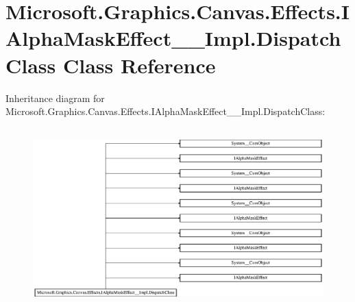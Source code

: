 \hypertarget{class_microsoft_1_1_graphics_1_1_canvas_1_1_effects_1_1_i_alpha_mask_effect_____impl_1_1_dispatch_class}{}\section{Microsoft.\+Graphics.\+Canvas.\+Effects.\+I\+Alpha\+Mask\+Effect\+\_\+\+\_\+\+Impl.\+Dispatch\+Class Class Reference}
\label{class_microsoft_1_1_graphics_1_1_canvas_1_1_effects_1_1_i_alpha_mask_effect_____impl_1_1_dispatch_class}
Inheritance diagram for Microsoft.\+Graphics.\+Canvas.\+Effects.\+I\+Alpha\+Mask\+Effect\+\_\+\+\_\+\+Impl.\+Dispatch\+Class\+:\begin{figure}[H]
\begin{center}
\leavevmode
\includegraphics[height=6.984127cm]{class_microsoft_1_1_graphics_1_1_canvas_1_1_effects_1_1_i_alpha_mask_effect_____impl_1_1_dispatch_class}
\end{center}
\end{figure}
